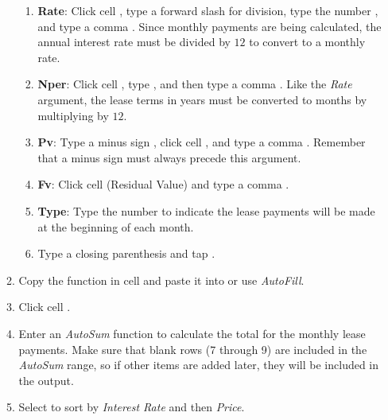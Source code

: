 \begin{enumbox}
\begin{enumerate}
\begin{enumerate}
			\begin{enumerate}
				\item \textbf{Rate}: Click cell , type a forward slash \fmtTyping{/} for division, type the number , and type a comma \fmtTyping{,}. Since monthly payments are being calculated, the annual interest rate must be divided by $ 12 $ to convert to a monthly rate.
				
				\item \textbf{Nper}: Click cell , type , and then type a comma \fmtTyping{,}. Like the \textit{Rate} argument, the lease terms in years must be converted to months by multiplying by $ 12 $.
				
				\item \textbf{Pv}: Type a minus sign \fmtTyping{-}, click cell , and type a comma \fmtTyping{,}. Remember that a minus sign must always precede this argument.
				
				\item \textbf{Fv}: Click cell  (Residual Value) and type a comma \fmtTyping{,}.
				
				\item \textbf{Type}: Type the number  to indicate the lease payments will be made at the beginning of each month.
				
				\item Type a closing parenthesis \fmtTyping{)} and tap . 
			\end{enumerate}
		
			\item Copy the  function in cell  and paste it into  or use \textit{AutoFill}.
			
			\item Click cell . 
			
			\item Enter an \textit{AutoSum} function to calculate the total for the monthly lease payments. Make sure that blank rows (7 through 9) are included in the \textit{AutoSum} range, so if other items are added later, they will be included in the output.
			
			\item Select  to sort by \textit{Interest Rate} and then \textit{Price}.
	

\end{enumerate}
\end{enumerate}
\end{enumbox}

